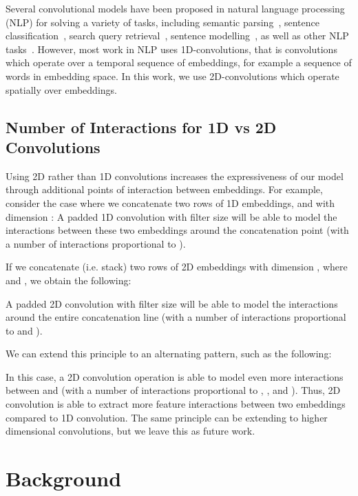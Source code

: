 \documentclass[letterpaper]{article}
\newcommand{\citep}{\cite}
\begin{document}
Several convolutional models have been proposed in natural language processing (NLP) for solving a variety of tasks, including semantic parsing~\citep{DBLP:conf/conll/YihTPM11}, sentence classification~\citep{DBLP:conf/emnlp/Kim14}, search query retrieval~\citep{DBLP:conf/www/ShenHGDM14}, sentence modelling~\citep{DBLP:conf/acl/KalchbrennerGB14}, as well as other NLP tasks~\citep{DBLP:journals/jmlr/CollobertWBKKK11}.
However, most work in NLP uses 1D-convolutions, that is convolutions which operate over a temporal sequence of embeddings, for example a sequence of words in embedding space.
In this work, we use 2D-convolutions which operate spatially over embeddings.


\subsection{Number of Interactions for 1D vs 2D Convolutions}


Using 2D rather than 1D convolutions increases the expressiveness of our model through additional points of interaction between embeddings.
For example, consider the case where we concatenate two rows of 1D embeddings,  and  with dimension : 
A padded 1D convolution with filter size  will be able to model the interactions between these two embeddings around the concatenation point (with a number of interactions proportional to ).


If we concatenate (i.e. stack) two rows of 2D embeddings with dimension , where  and , we obtain the following:

A padded 2D convolution with filter size  will be able to model the interactions around the entire concatenation line (with a number of interactions proportional to  and ).


We can extend this principle to an alternating pattern, such as the following:

In this case, a 2D convolution operation is able to model even more interactions between  and  (with a number of interactions proportional to , , and ).
Thus, 2D convolution is able to extract more feature interactions between two embeddings compared to 1D convolution.
The same principle can be extending to higher dimensional convolutions, but we leave this as future work.


\section{Background}
\end{document}
